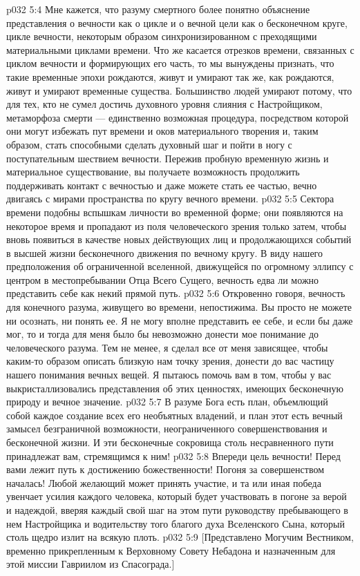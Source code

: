 \vs p032 5:4 Мне кажется, что разуму смертного более понятно объяснение представления о вечности как о цикле и о вечной цели как о бесконечном круге, цикле вечности, некоторым образом синхронизированном с преходящими материальными циклами времени. Что же касается отрезков времени, связанных с циклом вечности и формирующих его часть, то мы вынуждены признать, что такие временные эпохи рождаются, живут и умирают так же, как рождаются, живут и умирают временные существа. Большинство людей умирают потому, что для тех, кто не сумел достичь духовного уровня слияния с Настройщиком, метаморфоза смерти --- единственно возможная процедура, посредством которой они могут избежать пут времени и оков материального творения и, таким образом, стать способными сделать духовный шаг и пойти в ногу с поступательным шествием вечности. Пережив пробную временную жизнь и материальное существование, вы получаете возможность продолжить поддерживать контакт с вечностью и даже можете стать ее частью, вечно двигаясь с мирами пространства по кругу вечного времени.
\vs p032 5:5 Сектора времени подобны вспышкам личности во временной форме; они появляются на некоторое время и пропадают из поля человеческого зрения только затем, чтобы вновь появиться в качестве новых действующих лиц и продолжающихся событий в высшей жизни бесконечного движения по вечному кругу. В виду нашего предположения об ограниченной вселенной, движущейся по огромному эллипсу с центром в местопребывании Отца Всего Сущего, вечность едва ли можно представить себе как некий прямой путь.
\vs p032 5:6 Откровенно говоря, вечность для конечного разума, живущего во времени, непостижима. Вы просто не можете ни осознать, ни понять ее. Я не могу вполне представить ее себе, и если бы даже мог, то и тогда для меня было бы невозможно донести мое понимание до человеческого разума. Тем не менее, я сделал все от меня зависящее, чтобы каким\hyp{}то образом описать близкую нам точку зрения, донести до вас частицу нашего понимания вечных вещей. Я пытаюсь помочь вам в том, чтобы у вас выкристаллизовались представления об этих ценностях, имеющих бесконечную природу и вечное значение.
\vs p032 5:7 \pc В разуме Бога есть план, объемлющий собой каждое создание всех его необъятных владений, и план этот есть вечный замысел безграничной возможности, неограниченного совершенствования и бесконечной жизни. И эти бесконечные сокровища столь несравненного пути принадлежат вам, стремящимся к ним!
\vs p032 5:8 Впереди цель вечности! Перед вами лежит путь к достижению божественности! Погоня за совершенством началась! Любой желающий может принять участие, и та или иная победа увенчает усилия каждого человека, который будет участвовать в погоне за верой и надеждой, вверяя каждый свой шаг на этом пути руководству пребывающего в нем Настройщика и водительству того благого духа Вселенского Сына, который столь щедро излит на всякую плоть.
\vsetoff
\vs p032 5:9 [Представлено Могучим Вестником, временно прикрепленным к Верховному Совету Небадона и назначенным для этой миссии Гавриилом из Спасограда.]

